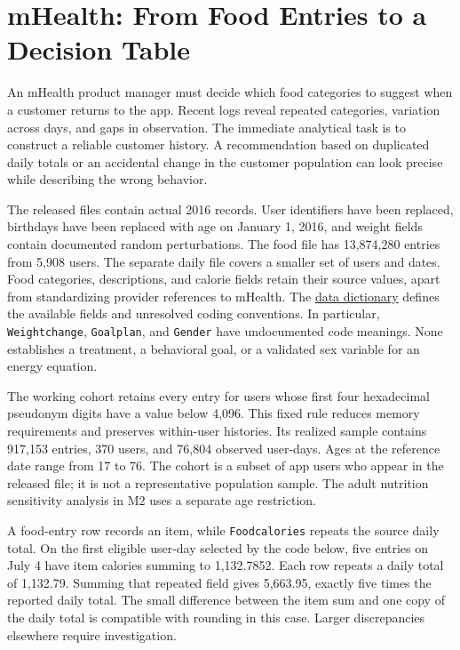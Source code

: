 \hypertarget{M01-mhealth-from-food-entries-to-a-decision-table}{%
\section{mHealth: From Food Entries to a Decision
Table}\label{M01-mhealth-from-food-entries-to-a-decision-table}}

\noindent An mHealth product manager must decide which food categories to suggest
when a customer returns to the app. Recent logs reveal repeated
categories, variation across days, and gaps in observation. The
immediate analytical task is to construct a reliable customer history. A
recommendation based on duplicated daily totals or an accidental change
in the customer population can look precise while describing the wrong
behavior.

The released files contain actual 2016 records. User identifiers have
been replaced, birthdays have been replaced with age on January 1, 2016,
and weight fields contain documented random perturbations. The food file
has 13,874,280 entries from 5,908 users. The separate daily file covers
a smaller set of users and dates. Food categories, descriptions, and
calorie fields retain their source values, apart from standardizing
provider references to mHealth. The
\href{../03_Data_and_Code/mHealth/DATA_DICTIONARY.md}{data dictionary}
defines the available fields and unresolved coding conventions. In
particular, \texttt{Weightchange}, \texttt{Goalplan}, and
\texttt{Gender} have undocumented code meanings. None establishes a
treatment, a behavioral goal, or a validated sex variable for an energy
equation.

The working cohort retains every entry for users whose first four
hexadecimal pseudonym digits have a value below 4,096. This fixed rule
reduces memory requirements and preserves within-user histories. Its
realized sample contains 917,153 entries, 370 users, and 76,804 observed
user-days. Ages at the reference date range from 17 to 76. The cohort is
a subset of app users who appear in the released file; it is not a
representative population sample. The adult nutrition sensitivity
analysis in M2 uses a separate age restriction.

A food-entry row records an item, while \texttt{Foodcalories} repeats
the source daily total. On the first eligible user-day selected by the
code below, five entries on July 4 have item calories summing to
1,132.7852. Each row repeats a daily total of 1,132.79. Summing that
repeated field gives 5,663.95, exactly five times the reported daily
total. The small difference between the item sum and one copy of the
daily total is compatible with rounding in this case. Larger
discrepancies elsewhere require investigation.

